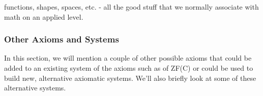 functions, shapes, spaces, etc. - all the good stuff that we normally associate with math on an applied level.









\subsubsection{Other Axioms and Systems}
In this section, we will mention a couple of other possible axioms that could be added to an existing system of the axioms such as of ZF(C) or could be used to build new, alternative axiomatic systems. We'll also briefly look at some of these alternative systems.

